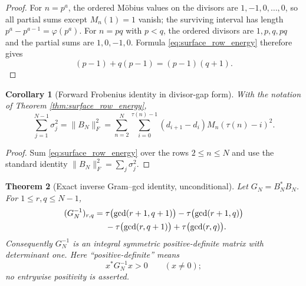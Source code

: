 \documentclass[11pt]{amsart}
\numberwithin{equation}{section}
\theoremstyle{plain}
\newtheorem{theorem}{Theorem}[section]
\newtheorem{corollary}[theorem]{Corollary}
\theoremstyle{definition}
\theoremstyle{remark}
\begin{document}
\begin{proof}
For $n=p^a$, the ordered Möbius values on the divisors are $1,-1,0,\ldots,0$, so all partial sums except $M_n(1)=1$ vanish; the surviving interval has length $p^a-p^{a-1}=\varphi(p^a)$.  For $n=pq$ with $p<q$, the ordered divisors are $1,p,q,pq$ and the partial sums are $1,0,-1,0$.  Formula \eqref{eq:surface_row_energy} therefore gives
\begin{equation}
(p-1)+q(p-1)=(p-1)(q+1).
\end{equation}
\end{proof}

\begin{corollary}[Forward Frobenius identity in divisor-gap form]
\label{cor:forward_frobenius}
With the notation of Theorem \ref{thm:surface_row_energy},
\begin{equation}
\sum_{j=1}^{N-1}\sigma_j^2
=\|B_N\|_F^2
=\sum_{n=2}^{N}\sum_{i=0}^{\tau(n)-1}
(d_{i+1}-d_i)M_n(\tau(n)-i)^2.
\label{eq:forward_frobenius_gap}
\end{equation}
\end{corollary}

\begin{proof}
Sum \eqref{eq:surface_row_energy} over the rows $2\le n\le N$ and use the standard identity $\|B_N\|_F^2=\sum_j\sigma_j^2$.
\end{proof}

\begin{theorem}[Exact inverse Gram--gcd identity, unconditional]
\label{thm:inverse_gram_gcd}
Let $G_N=B_N^*B_N$.  For $1\le r,q\le N-1$,
\begin{align}
(G_N^{-1})_{r,q}
={}&\tau\bigl(\gcd(r+1,q+1)\bigr)
-\tau\bigl(\gcd(r+1,q)\bigr) \notag\\
&-\tau\bigl(\gcd(r,q+1)\bigr)
+\tau\bigl(\gcd(r,q)\bigr).
\label{eq:inverse_gram_gcd}
\end{align}
Consequently $G_N^{-1}$ is an integral symmetric positive-definite matrix with determinant one.  Here ``positive-definite'' means
\begin{equation}
x^*G_N^{-1}x>0\qquad(x\ne0);
\label{eq:inverse_gram_positive_definite}
\end{equation}
no entrywise positivity is asserted.
\end{theorem}
\end{document}
